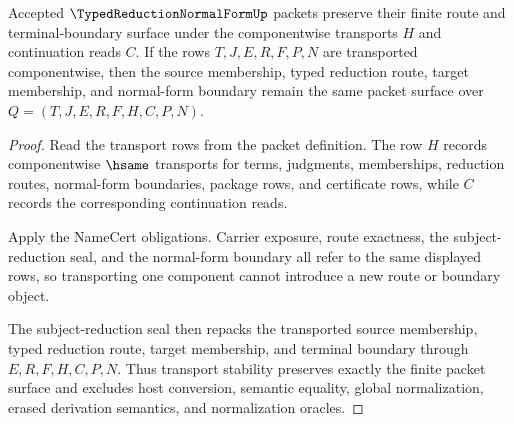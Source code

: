 \begin{theorem}
\label{thm:typed-reduction-normal-form-transport-stability}
Accepted $\TypedReductionNormalFormUp$ packets preserve their finite route and terminal-boundary surface under the componentwise transports $H$ and continuation reads $C$. If the rows $T,J,E,R,F,P,N$ are transported componentwise, then the source membership, typed reduction route, target membership, and normal-form boundary remain the same packet surface over $Q=(T,J,E,R,F,H,C,P,N)$.
\end{theorem}
\begin{proof}
Read the transport rows from the packet definition. The row $H$ records componentwise $\hsame$ transports for terms, judgments, memberships, reduction routes, normal-form boundaries, package rows, and certificate rows, while $C$ records the corresponding continuation reads.

Apply the NameCert obligations. Carrier exposure, route exactness, the subject-reduction seal, and the normal-form boundary all refer to the same displayed rows, so transporting one component cannot introduce a new route or boundary object.

The subject-reduction seal then repacks the transported source membership, typed reduction route, target membership, and terminal boundary through $E,R,F,H,C,P,N$. Thus transport stability preserves exactly the finite packet surface and excludes host conversion, semantic equality, global normalization, erased derivation semantics, and normalization oracles.
\end{proof}

